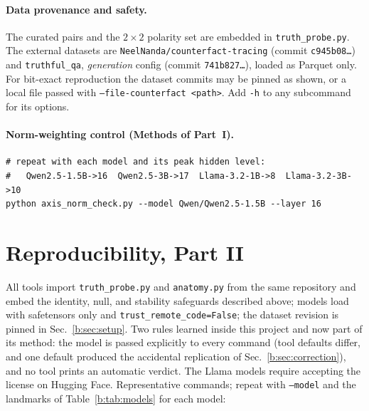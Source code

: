 \documentclass[11pt]{article}
\begin{document}
\paragraph{Data provenance and safety.} The curated pairs and the
$2{\times}2$ polarity set are embedded in \texttt{truth\_probe.py}. The
external datasets are \texttt{NeelNanda/counterfact-tracing} (commit
\texttt{c945b08\ldots}) and \texttt{truthful\_qa}, \emph{generation} config
(commit \texttt{741b827\ldots}), loaded as Parquet only. For bit-exact
reproduction the dataset commits may be pinned as shown, or a local file
passed with \texttt{--file-counterfact <path>}. Add \texttt{-h} to any
subcommand for its options.



\paragraph{Norm-weighting control (Methods of Part~I).}
\begin{verbatim}
# repeat with each model and its peak hidden level:
#   Qwen2.5-1.5B->16  Qwen2.5-3B->17  Llama-3.2-1B->8  Llama-3.2-3B->10
python axis_norm_check.py --model Qwen/Qwen2.5-1.5B --layer 16
\end{verbatim}

\section{Reproducibility, Part II}
\label{b:sec:repro}

All tools import \texttt{truth\_probe.py} and \texttt{anatomy.py} from the
same repository and embed the identity, null, and stability
safeguards described above; models load with safetensors only and
\texttt{trust\_remote\_code=False}; the dataset revision is pinned in
Sec.~\ref{b:sec:setup}. Two rules learned inside this project and now part of
its method: the model is passed explicitly to every command (tool defaults
differ, and one default produced the accidental replication of
Sec.~\ref{b:sec:correction}), and no tool prints an automatic verdict. The
Llama models require accepting the license on Hugging Face. Representative
commands; repeat with \texttt{--model} and the landmarks of
Table~\ref{b:tab:models} for each model:
\end{document}
